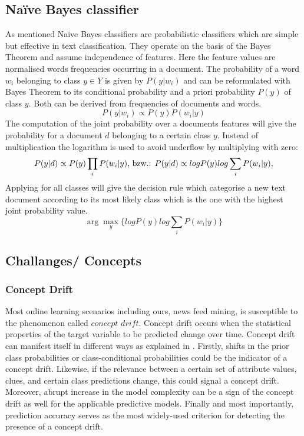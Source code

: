 \documentclass{article} %
\begin{document}
\subsection{Na\"ive Bayes classifier}
As mentioned Na\"ive Bayes classifiers are probabilistic classifiers which are simple but effective in text classification. They operate on the basis of the Bayes Theorem and assume independence of features. Here the feature values are normalised words frequencies occurring in a document. The probability of a word $w_i$ belonging to class $y \in Y$ is given by $P(y|w_i)$ and can be reformulated with Bayes Theorem to its conditional probability and a priori probability $ P(y)$ of class $y$. Both can be derived from frequencies of documents and words.
$$
P(y|w_i) \propto P(y)P(w_i|y)
$$
The computation of the joint probability over a documents features will give the probability for a  document $d$ belonging to a certain class $y$. Instead of multiplication the logarithm is used to avoid underflow by multiplying with zero:
$$
P(y|d) \propto P(y)\prod_i P(w_i|y)\space
\textrm{,  bzw.:    }
P(y|d) \propto log P(y) log \sum_i P(w_i|y),
$$
Applying for all classes will give the decision rule which categorise a new text document according to its most likely class which is the one with the highest joint probability value.
$$
\arg\max_y\{ log P(y) log \sum_i P(w_i|y)\}
$$

\subsection{Challanges/ Concepts}

\subsubsection{Concept Drift}
Most online learning scenarios including ours, news feed mining, is susceptible to the phenomenon called $concept$ $drift$. Concept drift occurs when the statistical properties of the target variable to be predicted change over time. Concept drift can manifest itself in different ways as explained in \cite[p. 1]{KunchevaEnsembleOverview08} . Firstly, shifts in the prior class probabilities or class-conditional probabilities could be the indicator of a concept drift. Likewise, if the relevance between a certain set of attribute values, clues, and certain class predictions change, this could signal a concept drift. Moreover, abrupt increase in the model complexity can be a sign of the concept drift as well for the applicable predictive models. Finally and most importantly, prediction accuracy serves as the most widely-used criterion for detecting the presence of a concept drift. 
\end{document}
